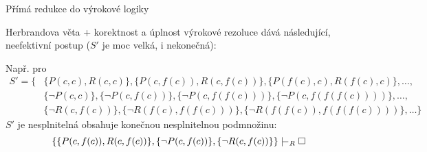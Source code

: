 \documentclass{beamer}
\begin{document}
\begin{frame}{Přímá redukce do výrokové logiky}

    Herbrandova věta + korektnost a úplnost výrokové rezoluce dává následující, neefektivní postup ($S'$ je moc velká, i nekonečná):
    
    \medskip

    
    \medskip

    Např. pro 
    {\footnotesize
    \begin{align*}
        S'=\{&\{P(c,c),R(c,c)\},\{P(c,f(c)),R(c,f(c))\},\{P(f(c),c),R(f(c),c)\},\dots,\\ 
        &\{\neg P(c,c)\}, \{\neg P(c,f(c))\},\{\neg P(c,f(f(c)))\},\{\neg P(c,f(f(f(c))))\}, \dots,\\
        &\{\neg R(c,f(c))\}, \{\neg R(f(c),f(f(c)))\},\{\neg R(f(f(c)),f(f(f(c))))\},\dots\}    
    \end{align*}
    }
    $S'$ je nesplnitelná obsahuje konečnou nesplnitelnou podmnožinu:
    $$
    \{\{P(c,f(c)),R(c,f(c))\},\{\neg P(c,f(c))\},\{\neg R(c,f(c))\}\}\proves_R\square
    $$


\end{frame}
\end{document}
